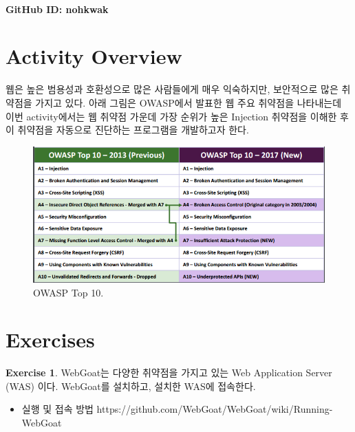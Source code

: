 \documentclass[a4paper, 11pt]{article}
\theoremstyle{definition}
\newtheorem{exercise}{Exercise}
\begin{document}
 \\
         {\phantom{} \hfill \textbf{GitHub ID: nohkwak}} \\

\section{Activity Overview}
웹은 높은 범용성과 호환성으로 많은 사람들에게 매우 익숙하지만, 보안적으로 많은 취약점을 가지고 있다. 아래 그림은 OWASP에서 발표한 웹 주요 취약점\cite{1}을 나타내는데 이번 activity에서는 웹 취약점 가운데 가장 순위가 높은 Injection 취약점을 이해한 후 이 취약점을 자동으로 진단하는 프로그램을 개발하고자 한다. 

\begin{figure}[h]
  \includegraphics[width=\linewidth]{owasptop.png}
  \caption{OWASP Top 10.}
  \label{fig:owasp}
\end{figure}

\section{Exercises}

\begin{exercise}

WebGoat\cite{2}는 다양한 취약점을 가지고 있는 Web Application Server (WAS) 이다. WebGoat를 설치하고, 설치한 WAS에 접속한다. 

\begin{itemize}
  \item 실행 및 접속 방법 https://github.com/WebGoat/WebGoat/wiki/Running-WebGoat  
\end{itemize}

\end{exercise}
\end{document}
